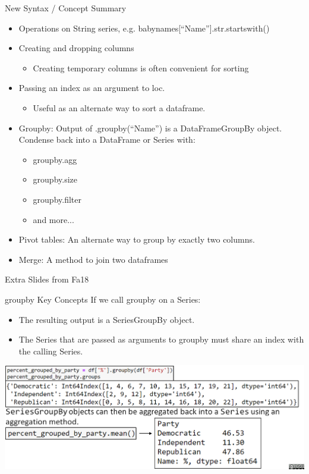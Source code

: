 \documentclass[aspectratio=169]{../latex_main/tntbeamer}  %
\begin{document}
     \begin{frame}{New Syntax / Concept Summary}
        \begin{itemize}
            \item Operations on String series, e.g. babynames[“Name”].str.startswith()
            \item Creating and dropping columns
            \begin{itemize}
                \item Creating temporary columns is often convenient for sorting
            \end{itemize}
            \item Passing an index as an argument to loc.
            \begin{itemize}
                \item Useful as an alternate way to sort a dataframe.
            \end{itemize}
            \item Groupby: Output of .groupby(“Name”) is a DataFrameGroupBy object. Condense back into a DataFrame or Series with:
            \begin{itemize}
                \item groupby.agg
                \item groupby.size
                \item groupby.filter
                \item and more...
            \end{itemize}
            \item Pivot tables: An alternate way to group by exactly two columns.
            \item Merge: A method to join two dataframes
        \end{itemize}
    \end{frame}
    
    
    \begin{frame}{Extra Slides from Fa18}

    \end{frame}
    
    
    
    
    \begin{frame}{groupby Key Concepts}
        If we call groupby on a Series:
        \begin{itemize}
            \item The resulting output is a SeriesGroupBy object.
            \item The Series that are passed as arguments to groupby must share an index with the calling Series.
        \end{itemize}
        \includegraphics[scale=.35]{Bild42}
    \end{frame}
    
\end{document}

